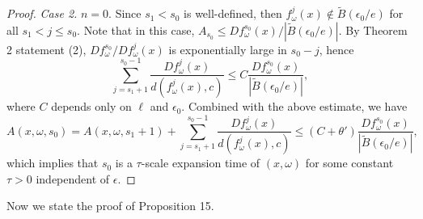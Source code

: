 \documentclass[11pt,oneside]{article}
\theoremstyle{plain}
\numberwithin{equation}{section}
\numberwithin{figure}{section}
\numberwithin{table}{section}
\begin{document}
\begin{proof}
{\it Case 2.} $n =0$. Since $s_1 < s_0$ is well-defined, then $f_{\omega}^j(x) \notin \tilde B(\epsilon_0/e)$ for all $s_1 < j \leq s_0$. Note that in this case, $A_{s_0} \leq Df_{\omega}^{s_0} (x) / |\tilde B(\epsilon_0/e)|$. By Theorem 2 statement (2), $Df_{\omega}^{s_0} / Df_{\omega}^j (x)$ is exponentially large in $s_0 -j$, hence 
\[
\sum_{j = s_1 +1}^{s_0 -1}  \frac{D f_{\omega}^j(x)}{ d(f_{\omega}^j(x), c)} \leq C  \frac{D f_{\omega}^{s_0}(x)}{ |\tilde B(\epsilon_0/e)|},
\]
where $C$ depends only on $\ell$ and $\epsilon_0$. Combined with the above estimate, we have 
\[
A(x, \omega, s_0) = A(x, \omega, s_1 + 1) +  \sum_{j = s_1 +1}^{s_0 -1}  \frac{D f_{\omega}^j(x)}{ d(f_{\omega}^j(x), c)} \leq (C + \theta') \frac{Df_{\omega}^{s_0} (x)}{ |\tilde B(\epsilon_0/e)|},
\]
which implies that $s_0$ is a $\tau$-scale expansion time of $(x, \omega)$ for some constant $\tau > 0$ independent of $\epsilon$.

\end{proof}


Now we state the proof of Proposition 15.
\end{document}
